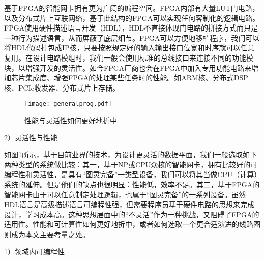 基于FPGA的智能网卡拥有更为广阔的编程空间。FPGA内部有大量LUT门电路，以及分布式片上互联网络，基于此结构的FPGA可以实现任何客制化的逻辑电路。FPGA使用硬件描述语言开发（HDL），HDL不直接体现门电路的拼接方式而只是一种行为描述语言，从而屏蔽了底层细节。FPGA可以方便地移植程序，我们可以将HDL代码打包成IP核，只要按照规定好的输入输出接口位宽和时序就可以任意复用。在设计电路模组时，我们一般会使用标准的总线接口来连接不同的功能模块，以增强开发的灵活性。如今FPGA厂商也会在FPGA中加入专用功能电路来增加芯片集成度、增强FPGA的处理某些任务时的性能。如ARM核、分布式DSP核、PCIe收发器、分布式片上存储。

\begin{figure}[!ht]
	\centering
	\texttt{[image: generalprog.pdf]}
	\caption{性能与灵活性如何更好地折中} \label{fig:generalprog}
\end{figure}

2）灵活性与性能

如图\ref{fig:generalprog}所示，基于目前业界的技术，为设计更灵活的数据平面，我们一般选取如下两种类型的系统做比较：其一，基于NP或CPU众核的智能网卡，拥有比较好的可编程性和灵活性，是具有“图灵完备”一类型设备，我们可以将其当做CPU（计算）系统的延伸。但是他们的缺点也很明显：性能低，效率不足。其二，基于FPGA的智能网卡由于可以任意制定处理逻辑，也属于“图灵完备”的一系列设备。虽然HDL语言是高级描述语言可编程性强，但需要程序员基于硬件电路的思想来完成设计，学习成本高。这种思想层面中的“不灵活”作为一种挑战，又阻碍了FPGA的适用性。性能和可计算性如何更好地折中，或者如何选取一个更合适演进的线路图则成为本文主要考量之处。






\label{chap232}%

1）领域内可编程性



